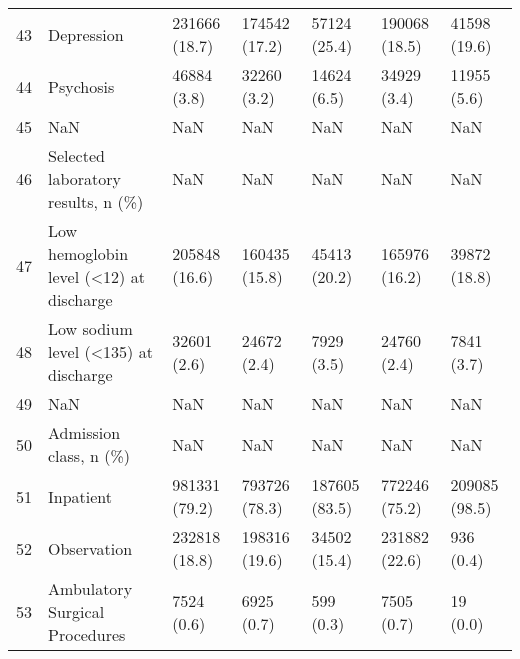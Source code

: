 \begin{tabular}{lllllll}
43 &                                         Depression &      231666 (18.7) &                 174542 (17.2) &              57124 (25.4) &                  190068 (18.5) &              41598 (19.6) \\
44 &                                          Psychosis &        46884 (3.8) &                   32260 (3.2) &               14624 (6.5) &                    34929 (3.4) &               11955 (5.6) \\
45 &                                                NaN &                NaN &                           NaN &                       NaN &                            NaN &                       NaN \\
46 &                 Selected laboratory results, n (\%) &                NaN &                           NaN &                       NaN &                            NaN &                       NaN \\
47 &            Low hemoglobin level (<12) at discharge &      205848 (16.6) &                 160435 (15.8) &              45413 (20.2) &                  165976 (16.2) &              39872 (18.8) \\
48 &               Low sodium level (<135) at discharge &        32601 (2.6) &                   24672 (2.4) &                7929 (3.5) &                    24760 (2.4) &                7841 (3.7) \\
49 &                                                NaN &                NaN &                           NaN &                       NaN &                            NaN &                       NaN \\
50 &                             Admission class, n (\%) &                NaN &                           NaN &                       NaN &                            NaN &                       NaN \\
51 &                                          Inpatient &      981331 (79.2) &                 793726 (78.3) &             187605 (83.5) &                  772246 (75.2) &             209085 (98.5) \\
52 &                                        Observation &      232818 (18.8) &                 198316 (19.6) &              34502 (15.4) &                  231882 (22.6) &                 936 (0.4) \\
53 &                     Ambulatory Surgical Procedures &         7524 (0.6) &                    6925 (0.7) &                 599 (0.3) &                     7505 (0.7) &                  19 (0.0) \\

\end{tabular}
